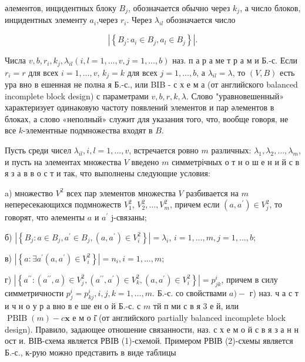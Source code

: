 \documentclass[10pt]{article}
\begin{document}
әлементов, инцидентных блоку $B_{j}$, обозначается обычно через $k_{j}$, а число блоков, инцидентных элементу $a_{i}$,через $r_{i}$. Через $\lambda_{i l}$ обозначается число



\[

\left|\left\{B_{j}: a_{i} \in B_{j}, a_{l} \in B_{j}\right\}\right| .

\]



Числа $v, b, r_{i}, k_{j}, \lambda_{i l}(i, l=1, \ldots, v, j=1, \ldots, b)$ наз. п а р а ме т р а м и Б.-с. Если $r_{i}=r$ для всех $i=1, \ldots, v$, $k_{j}=k$ для всех $j=1, \ldots, b$, а $\lambda_{i l}=\lambda$, то $(V, B)$ есть ура вно в ешенная не полна я Б.-с., или BIB - с х е м а (от английского balanced incomplete block design) с параметрами $v, b, r, k, \lambda$. Слово "уравновешенный» характеризует одинаковую частоту появлений элементов и пар әлементов в блоках, а слово «неполный» служит для указания того, что, вообще говоря, не все $k$-элементные подмножества входят в $B$.



Пусть среди чисел $\lambda_{i l}, i, l=1, \ldots, v$, встречается ровно $m$ различных: $\lambda_{1}, \lambda_{2}, \ldots, \lambda_{m}$, и пусть на элементах множества $V$ введено $m$ симметрічных о т н о ш е н и й с в я з а в в о с т и так, что выполнены следующие условия:



a) множество $V^{2}$ всех пар элементов множества $V$ разбивается на $m$ непересекающихся подмножеств $V_{1}^{2}$, $V_{2}^{2}, \ldots, V_{m}^{2}$, причем если $\left(a, a^{\prime}\right) \in V_{j}^{2}$, то говорят, что әлементы $a$ и $a^{\prime}$ j-связаны;



б) $\left|\left\{B_{j}: a \in B_{j}, a^{\prime} \in B_{j},\left(a, a^{\prime}\right) \in V_{i}^{2}\right\}\right|=\lambda_{i}$, $i=1, \ldots, m, j=1, \ldots, b$;



в) $\left|\left\{a: \exists a^{\prime}\left(a, a^{\prime}\right) \in V_{i}^{2}\right\}\right|=n_{i}, i=1, \ldots, m$;



г) $\left|\left\{a^{\prime \prime}:\left(a^{\prime \prime}, a\right) \in V_{j}^{2},\left(a^{\prime \prime}, a^{\prime}\right) \in V_{k}^{2},\left(a, a^{\prime}\right) \in V_{i}^{2}\right\}\right|=p_{j k}^{i}$, причем в силу симметричности $p_{j}^{i}=p_{k j}^{i}, i, j, k=1, \ldots, m$. Б.-с. со свойствами $a)-$ г) наз. ч а с т и ч н о у р а вно в е ше ен о й Б.-с. с $m$ тй п ми с в я 3 е й, или $\operatorname{PBIB}(m)-c \mathbf{x}$ е м о і̆ (от английского partially balanced incomplete block design). Правило, задающее отношение связанности, наз. с х е м о й с в я з а н н ост и. ВІВ-схема является РВІВ (1)-схемой. Примером РВІВ (2)-схемы является Б.-с., к-рую можно представить в виде таблицы
\end{document}
